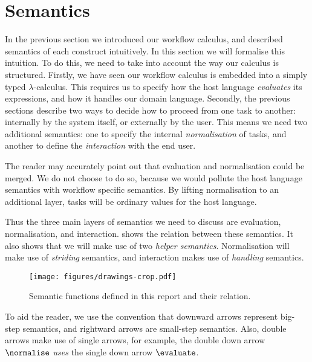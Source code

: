 


\section{Semantics}

In the previous section we introduced our workflow calculus,
and described semantics of each construct intuitively.
In this section we will formalise this intuition.
To do this,
we need to take into account the way our calculus is structured.
Firstly,
we have seen our workflow calculus is embedded into a simply typed $\lambda$-calculus.
This requires us to specify how the host language \emph{evaluates} its expressions,
and how it handles our domain language.
Secondly,
the previous sections describe two ways to decide how to proceed from one task to another:
internally by the system itself, or externally by the user.
This means we need two additional semantics:
one to specify the internal \emph{normalisation} of tasks,
and another to define the \emph{interaction} with the end user.

The reader may accurately point out that evaluation and normalisation could be merged.
We do not choose to do so,
because we would pollute the host language semantics with workflow specific semantics.
By lifting normalisation to an additional layer,
tasks will be ordinary values for the host language.

Thus the three main layers of semantics we need to discuss are evaluation, normalisation, and interaction.
 shows the relation between these semantics.
It also shows that we will make use of two \emph{helper semantics}.
Normalisation will make use of \emph{striding} semantics,
and interaction makes use of \emph{handling} semantics.

\begin{figure}[h]
  \centering
  \texttt{[image: figures/drawings-crop.pdf]}
  \caption{
    Semantic functions defined in this report and their relation.
  }
  \label{fig:semantic-functions}
\end{figure}

To aid the reader,
we use the convention that downward arrows represent big-step semantics,
and rightward arrows are small-step semantics.
Also, double arrows make use of single arrows,
for example, the double down arrow $\normalise$ \emph{uses} the single down arrow $\evaluate$.



